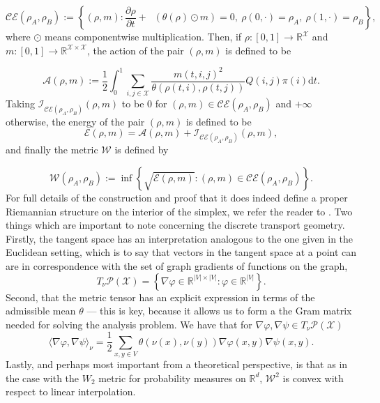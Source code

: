 \documentclass{article}
\newcommand{\R}{\mathbb{R}}
\newcommand{\E}{\mathcal{E}}
\newcommand{\A}{\mathcal{A}}
\newcommand{\I}{\mathcal{I}}
\newcommand{\W}{\mathcal{W}}
\newcommand{\X}{\mathcal{X}}
\DeclareMathOperator*{\divx}{div_{\X}}
\begin{document}
\begin{equation*}
  \mathcal{CE}(\rho_A, \rho_B) := \left\{ (\rho, m) : \frac{\partial\rho}{\partial t} + \divx(\theta(\rho) \odot m) = 0, \: \rho(0, \cdot) = \rho_A, \: \rho(1, \cdot) = \rho_B \right\},
\end{equation*}
where \(\odot\) means componentwise multiplication. Then, if \(\rho:[0,1] \to \R^\X\) and \(m:[0,1]\to \R^{\X\times\X}\), the action of the pair \((\rho, m)\) is defined to be

\begin{equation*}
  \A(\rho, m) := \frac{1}{2} \int_0^1 \sum\limits_{i,j \in \X} \frac{m(t,i,j)^2}{\theta(\rho(t,i), \rho(t,j))}Q(i,j)\pi(i) \mathrm{d}t.
\end{equation*}
Taking \(\I_{\mathcal{CE}(\rho_A, \rho_B)}(\rho,m)\) to be \(0\) for \((\rho,m) \in \mathcal{CE}(\rho_A, \rho_B)\) and \(+\infty\) otherwise, the energy of the pair \((\rho,m)\) is defined to be
\begin{equation*}
  \E(\rho,m) = \A(\rho,m) + \I_{\mathcal{CE}(\rho_A, \rho_B)}(\rho, m),
\end{equation*}
and finally the metric \(\W\) is defined by

\begin{equation*}
  \W(\rho_A, \rho_B) := \inf \left\{ \sqrt{\E(\rho, m)} : (\rho, m) \in \mathcal{CE}(\rho_A, \rho_B) \right\}.
\end{equation*}
For full details of the construction and proof that it does indeed define a proper Riemannian structure on the interior of the simplex, we refer the reader to \cite{maasGradientFlowsEntropy2011}. Two things which are important to note concerning the discrete transport geometry. Firstly, the tangent space has an interpretation analogous to the one given in the Euclidean setting, which is to say that vectors in the tangent space at a point can are in correspondence with the set of graph gradients of functions on the graph,
\[T_{\nu}\mathcal{P}(\X) = \left\{\nabla\varphi \in \R^{|V|\times|V|} : \varphi \in \R^{|V|}\right\}.\] 
Second, that the metric tensor has an explicit expression in terms of the admissible mean \(\theta\) --- this is key, because it allows us to form a the Gram matrix needed for solving the analysis problem. We have that for \(\nabla\varphi, \nabla\psi \in T_{\nu}\mathcal{P}(\X)\)
\[\langle\nabla\varphi,\nabla\psi\rangle_{\nu} = \frac{1}{2}\sum\limits_{x,y \in V}\theta(\nu(x),\nu(y))\nabla\varphi(x,y)\nabla\psi(x,y).\]
Lastly, and perhaps most important from a theoretical perspective, is that as in the case with the \(W_2\) metric for probability measures on \(\R^d\), \(\W^2\) is convex with respect to linear interpolation.
\end{document}
